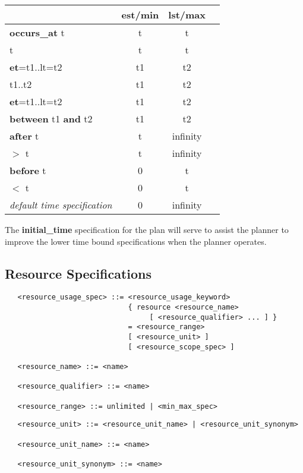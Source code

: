 \begin{center} 
\begin{tabular}{|l|c|c|c|}
\hline
&est/min&lst/max \\
\hline
{\bf occurs\_at} t&t&t \\
t&t&t \\
{\bf et}=t1..lt=t2&t1&t2 \\
t1..t2&t1&t2 \\
{\bf et}=t1..lt=t2&t1&t2 \\
{\bf between} t1 {\bf and} t2&t1&t2 \\
{\bf after} t&t&infinity \\
$>$ t&t&infinity \\
{\bf before} t&0&t \\
$<$ t&0&t \\
{\em default time specification}&0&infinity \\
\hline
\end{tabular}
\end{center}

The {\bf initial\_time} specification for the plan will serve to
assist the planner to improve the lower time bound specifications when the
planner operates. 

\subsection{Resource Specifications}

\begin{verbatim}
   <resource_usage_spec> ::= <resource_usage_keyword>
                             { resource <resource_name>
                                  [ <resource_qualifier> ... ] }
                             = <resource_range>
                             [ <resource_unit> ]
                             [ <resource_scope_spec> ]

   <resource_name> ::= <name>

   <resource_qualifier> ::= <name>

   <resource_range> ::= unlimited | <min_max_spec>
\end{verbatim}

\begin{verbatim}
   <resource_unit> ::= <resource_unit_name> | <resource_unit_synonym>

   <resource_unit_name> ::= <name>

   <resource_unit_synonym> ::= <name>
\end{verbatim}

